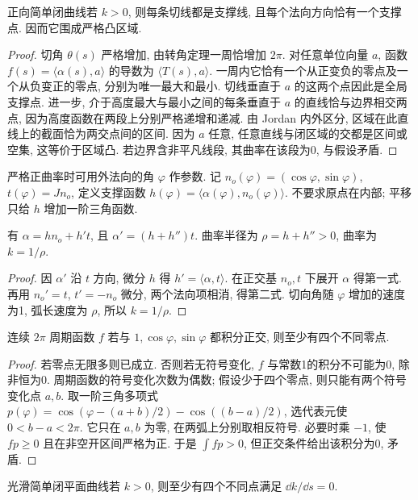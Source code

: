 \begin{proposition}\label{prop:strict-convex}
正向简单闭曲线若 $k>0$, 则每条切线都是支撑线, 且每个法向方向恰有一个支撑点. 因而它围成严格凸区域.
\end{proposition}
\begin{proof}
切角 $\theta(s)$ 严格增加, 由转角定理一周恰增加 $2\pi$. 对任意单位向量 $a$, 函数 $f(s)=\langle\alpha(s),a\rangle$ 的导数为 $\langle T(s),a\rangle$. 一周内它恰有一个从正变负的零点及一个从负变正的零点, 分别为唯一最大和最小. 切线垂直于 $a$ 的这两个点因此是全局支撑点. 进一步, 介于高度最大与最小之间的每条垂直于 $a$ 的直线恰与边界相交两点, 因为高度函数在两段上分别严格递增和递减. 由 Jordan 内外区分, 区域在此直线上的截面恰为两交点间的区间. 因为 $a$ 任意, 任意直线与闭区域的交都是区间或空集, 这等价于区域凸. 若边界含非平凡线段, 其曲率在该段为0, 与假设矛盾.
\end{proof}
严格正曲率时可用外法向的角 $\varphi$ 作参数. 记 $n_o(\varphi)=(\cos\varphi,\sin\varphi)$, $t(\varphi)=Jn_o$, 定义支撑函数 $h(\varphi)=\langle\alpha(\varphi),n_o(\varphi)\rangle$. 不要求原点在内部; 平移只给 $h$ 增加一阶三角函数.
\begin{proposition}\label{prop:support}
有 $\alpha=hn_o+h't$, 且 $\alpha'=(h+h'')t$. 曲率半径为 $\rho=h+h''>0$, 曲率为 $k=1/\rho$.
\end{proposition}
\begin{proof}
因 $\alpha'$ 沿 $t$ 方向, 微分 $h$ 得 $h'=\langle\alpha,t\rangle$. 在正交基 $n_o,t$ 下展开 $\alpha$ 得第一式. 再用 $n_o'=t$, $t'=-n_o$ 微分, 两个法向项相消, 得第二式. 切向角随 $\varphi$ 增加的速度为1, 弧长速度为 $\rho$, 所以 $k=1/\rho$.
\end{proof}
\begin{lemma}\label{lem:sturm}
连续 $2\pi$ 周期函数 $f$ 若与 $1,\cos\varphi,\sin\varphi$ 都积分正交, 则至少有四个不同零点.
\end{lemma}
\begin{proof}
若零点无限多则已成立. 否则若无符号变化, $f$ 与常数1的积分不可能为0, 除非恒为0. 周期函数的符号变化次数为偶数; 假设少于四个零点, 则只能有两个符号变化点 $a,b$. 取一阶三角多项式 $p(\varphi)=\cos(\varphi-(a+b)/2)-\cos((b-a)/2)$, 选代表元使 $0<b-a<2\pi$. 它只在 $a,b$ 为零, 在两弧上分别取相反符号. 必要时乘 $-1$, 使 $fp\ge0$ 且在非空开区间严格为正. 于是 $\int fp>0$, 但正交条件给出该积分为0, 矛盾.
\end{proof}
\begin{theorem}[严格正曲率的四顶点定理]
光滑简单闭平面曲线若 $k>0$, 则至少有四个不同点满足 $\dd k/\dd s=0$.
\end{theorem}
